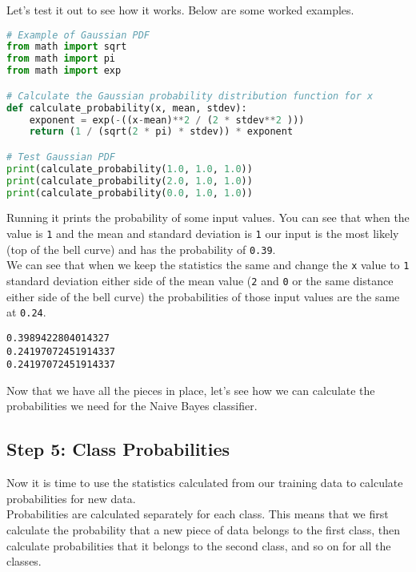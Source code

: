 \documentclass[12pt]{article}
\begin{document}
Let's test it out to see how it works. Below are some worked examples.

\newpage

\begin{lstlisting}[language=python]
# Example of Gaussian PDF
from math import sqrt
from math import pi
from math import exp

# Calculate the Gaussian probability distribution function for x
def calculate_probability(x, mean, stdev):
	exponent = exp(-((x-mean)**2 / (2 * stdev**2 )))
	return (1 / (sqrt(2 * pi) * stdev)) * exponent

# Test Gaussian PDF
print(calculate_probability(1.0, 1.0, 1.0))
print(calculate_probability(2.0, 1.0, 1.0))
print(calculate_probability(0.0, 1.0, 1.0))

\end{lstlisting}

Running it prints the probability of some input values. You can see that when the value is \verb|1| and the mean and standard deviation is \verb|1| our input is the most likely (top of the bell curve) and has the probability of \verb|0.39|.\\

We can see that when we keep the statistics the same and change the \verb|x| value to \verb|1| standard deviation either side of the mean value (\verb|2| and \verb|0| or the same distance either side of the bell curve) the probabilities of those input values are the same at \verb|0.24|.\\

\begin{lstlisting}
0.3989422804014327
0.24197072451914337
0.24197072451914337

\end{lstlisting}

Now that we have all the pieces in place, let's see how we can calculate the probabilities we need for the Naive Bayes classifier.

\newpage

\subsection{Step 5: Class Probabilities}

Now it is time to use the statistics calculated from our training data to calculate probabilities for new data.\\

Probabilities are calculated separately for each class. This means that we first calculate the probability that a new piece of data belongs to the first class, then calculate probabilities that it belongs to the second class, and so on for all the classes.\\
\end{document}
